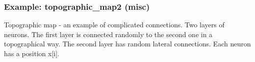 \documentclass[letterpaper,10pt,english]{manual}
\begin{document}
\resetcurrentobjects
\hypertarget{--doc-examples-misc_topographic_map2}{}

\hypertarget{index-87}{}\subsubsection{Example: topographic\_map2 (misc)}

Topographic map - an example of complicated connections.
Two layers of neurons.
The first layer is connected randomly to the second one in a
topographical way.
The second layer has random lateral connections.
Each neuron has a position x{[}i{]}.
\end{document}
